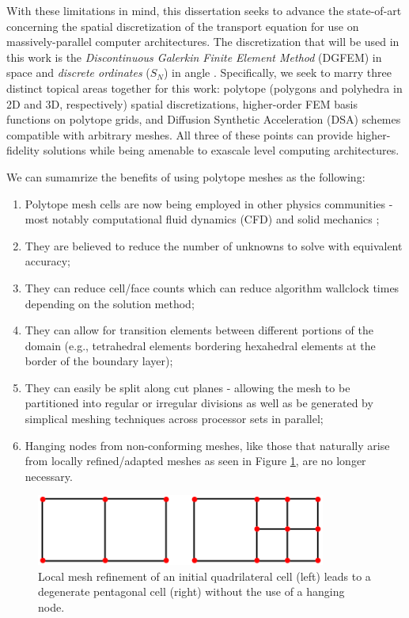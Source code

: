 With these limitations in mind, this dissertation seeks to advance the state-of-art concerning the spatial discretization of the transport equation for use on massively-parallel computer architectures. The discretization that will be used in this work is the {\em Discontinuous Galerkin Finite Element Method} (DGFEM) in space and {\em discrete ordinates} ($S_N$) in angle \cite{johnson1984finite,morel2005s}. Specifically, we seek to marry three distinct topical areas together for this work: polytope (polygons and polyhedra in 2D and 3D, respectively) spatial discretizations, higher-order FEM basis functions on polytope grids, and Diffusion Synthetic Acceleration (DSA) schemes compatible with arbitrary meshes. All three of these points can provide higher-fidelity solutions while being amenable to exascale level computing architectures.

We can sumamrize the benefits of using polytope meshes as the following:

\begin{enumerate}
	\item Polytope mesh cells are now being employed in other physics communities - most notably computational fluid dynamics (CFD) \cite{ref::star_CCM} and solid mechanics \cite{yip2005automated};
	\item They are believed to reduce the number of unknowns to solve with equivalent accuracy;
	\item They can reduce cell/face counts which can reduce algorithm wallclock times depending on the solution method;
	\item They can allow for transition elements between different portions of the domain (e.g., tetrahedral elements bordering hexahedral elements at the border of the boundary layer);
	\item They can easily be split along cut planes - allowing the mesh to be partitioned into regular or irregular divisions as well as be generated by simplical meshing techniques across processor sets in parallel;
	\item Hanging nodes from non-conforming meshes, like those that naturally arise from locally refined/adapted meshes as seen in Figure \ref{fig::Intro_locally_refined_vertices}, are no longer necessary. 
\end{enumerate}

\begin{figure}
\centering
\includegraphics[width=0.85\textwidth]{figures/sec_Intro/locally_refined_vertices.png}
\caption{Local mesh refinement of an initial quadrilateral cell (left) leads to a degenerate pentagonal cell (right) without the use of a hanging node.}
\label{fig::Intro_locally_refined_vertices}
\end{figure}

